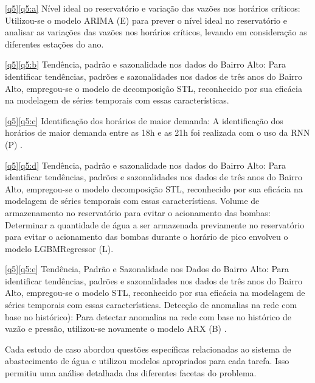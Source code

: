 \ref{q5}\eqref{q5:a} Nível ideal no reservatório e variação das vazões nos horários críticos: Utilizou-se o modelo ARIMA (E) \cite{2-s2.0-85069459067} para prever o nível ideal no reservatório e analisar as variações das vazões nos horários críticos, levando em consideração as diferentes estações do ano.

\ref{q5}\eqref{q5:b} Tendência, padrão e sazonalidade nos dados do Bairro Alto: Para identificar tendências, padrões e sazonalidades nos dados de três anos do Bairro Alto, empregou-se o modelo de decomposição STL, reconhecido por sua eficácia na modelagem de séries temporais com essas características.

\ref{q5}\eqref{q5:c} Identificação dos horários de maior demanda: A identificação dos horários de maior demanda entre as 18h e as 21h foi realizada com o uso da RNN (P) \cite{2-s2.0-85067419084}.

\ref{q5}\eqref{q5:d} Tendência, padrão e sazonalidade nos dados do Bairro Alto: Para identificar tendências, padrões e sazonalidades nos dados de três anos do Bairro Alto, empregou-se o modelo decomposição STL, reconhecido por sua eficácia na modelagem de séries temporais com essas características. Volume de armazenamento no reservatório para evitar o acionamento das bombas: Determinar a quantidade de água a ser armazenada previamente no reservatório para evitar o acionamento das bombas durante o horário de pico envolveu o modelo LGBMRegressor (L).

\ref{q5}\eqref{q5:e} Tendência, Padrão e Sazonalidade nos Dados do Bairro Alto: Para identificar tendências, padrões e sazonalidades nos dados de três anos do Bairro Alto, empregou-se o modelo STL, reconhecido por sua eficácia na modelagem de séries temporais com essas características. Detecção de anomalias na rede com base no histórico): Para detectar anomalias na rede com base no histórico de vazão e pressão, utilizou-se novamente o modelo ARX (B) \cite{2-s2.0-85051469381}.

Cada estudo de caso abordou questões específicas relacionadas ao sistema de abastecimento de água e utilizou modelos apropriados para cada tarefa. Isso permitiu uma análise detalhada das diferentes facetas do problema.

